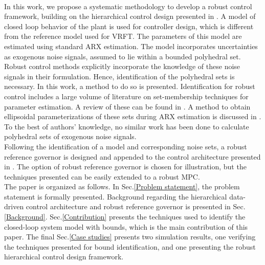 \documentclass[letterpaper, 10 pt, conference]{ieeeconf}  %
\begin{document}
\\ \indent
In this work, we propose a systematic methodology to develop a robust control framework, building on the hierarchical control design presented in \cite{7932940}. A model of closed loop behavior of the plant is used for  controller design, which is different from the reference model used for VRFT. The parameters of this model are estimated using standard ARX estimation. 
 The model incorporates uncertainties as exogenous noise signals, assumed to lie within a bounded polyhedral set. Robust control methods explicitly incorporate the knowledge of these noise signals in their formulation. Hence, identification of the polyhedral sets is necessary. In this work, a method to do so is presented. Identification for robust control includes a large volume of literature on set-membership techniques for parameter estimation. A review of these can be found in \cite{WALTER1990449}. A method to obtain ellipsoidal parameterizations of these sets during ARX estimation is discussed in \cite{7330793}. To the best of authors' knowledge, no similar work has been done to calculate polyhedral sets of exogenous noise signals.
 \\
  Following the identification of a model and corresponding noise sets, a robust reference governor is designed and appended to the control architecture presented in \cite{7932940}.
 The option of robust reference governor is chosen for illustration, but the techniques presented can be easily extended to a robust MPC.
 \\ \indent
 The paper is organized as follows. In Sec.\ref{Problem statement}, the problem statement is formally presented. Background regarding the hierarchical data-driven control architecture and robust reference governor is presented in Sec.\ref{Background}. Sec.\ref{Contribution} presents the techniques used to identify the closed-loop system model with bounds, which is the main contribution of this paper. The final Sec.\ref{Case studies} presents two simulation results, one verifying the techniques presented for bound identification, and one presenting the robust hierarchical control design framework. 
\end{document}
